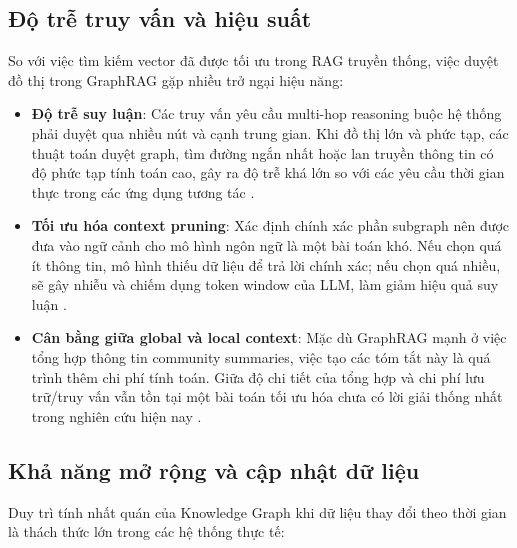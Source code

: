 \subsection{Độ trễ truy vấn và hiệu suất}
So với việc tìm kiếm vector đã được tối ưu trong RAG truyền thống, việc duyệt đồ thị trong GraphRAG gặp nhiều trở ngại hiệu năng:

\begin{itemize}
    \item \textbf{Độ trễ suy luận}: Các truy vấn yêu cầu multi-hop reasoning buộc hệ thống phải duyệt qua nhiều nút và cạnh trung gian. Khi đồ thị lớn và phức tạp, các thuật toán duyệt graph, tìm đường ngắn nhất hoặc lan truyền thông tin có độ phức tạp tính toán cao, gây ra độ trễ khá lớn so với các yêu cầu thời gian thực trong các ứng dụng tương tác \cite{luo2024reasoning, edge2024global}.
    
    \item \textbf{Tối ưu hóa context pruning}: Xác định chính xác phần subgraph nên được đưa vào ngữ cảnh cho mô hình ngôn ngữ là một bài toán khó. Nếu chọn quá ít thông tin, mô hình thiếu dữ liệu để trả lời chính xác; nếu chọn quá nhiều, sẽ gây nhiễu và chiếm dụng token window của LLM, làm giảm hiệu quả suy luận \cite{pan2024unifying, edge2024global}.
    
    \item \textbf{Cân bằng giữa global và local context}: Mặc dù GraphRAG mạnh ở việc tổng hợp thông tin community summaries, việc tạo các tóm tắt này là quá trình thêm chi phí tính toán. Giữa độ chi tiết của tổng hợp và chi phí lưu trữ/truy vấn vẫn tồn tại một bài toán tối ưu hóa chưa có lời giải thống nhất trong nghiên cứu hiện nay \cite{edge2024global}.
\end{itemize}

\subsection{Khả năng mở rộng và cập nhật dữ liệu}
Duy trì tính nhất quán của Knowledge Graph khi dữ liệu thay đổi theo thời gian là thách thức lớn trong các hệ thống thực tế:

